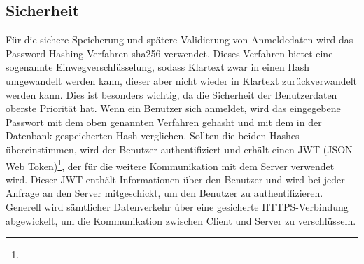 \documentclass[main.tex]{subfiles}
\begin{document}
    \subsection{Sicherheit}
    Für die sichere Speicherung und spätere Validierung von Anmeldedaten wird das Password-Hashing-Verfahren sha256 verwendet.
    Dieses Verfahren bietet eine sogenannte Einwegverschlüsselung, sodass Klartext zwar in einen Hash umgewandelt werden kann, dieser aber nicht wieder in Klartext zurückverwandelt werden kann.
    Dies ist besonders wichtig, da die Sicherheit der Benutzerdaten oberste Priorität hat.
    Wenn ein Benutzer sich anmeldet, wird das eingegebene Passwort mit dem oben genannten Verfahren gehasht und mit dem in der Datenbank gespeicherten Hash verglichen.
    Sollten die beiden Hashes übereinstimmen, wird der Benutzer authentifiziert und erhält einen JWT (JSON Web Token)\footnote{}, der für die weitere Kommunikation mit dem Server verwendet wird.
    Dieser JWT enthält Informationen über den Benutzer und wird bei jeder Anfrage an den Server mitgeschickt, um den Benutzer zu authentifizieren.
    Generell wird sämtlicher Datenverkehr über eine gesicherte HTTPS-Verbindung abgewickelt, um die Kommunikation zwischen Client und Server zu verschlüsseln.
\end{document}
